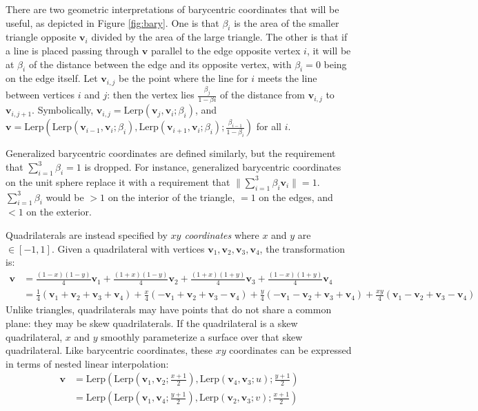 \documentclass{amsart}[12pt]
\begin{document}
There are two geometric interpretations of barycentric coordinates that will be
useful, as depicted in Figure \ref{fig:bary}. One is that $\beta_i$ is the area
of the smaller triangle opposite $\mathbf v_i$ divided by the area of the large
triangle.
The other is that if a line is placed passing through $\mathbf v$ parallel to
the edge opposite vertex $i$, it will be at $\beta_i$ of the distance between
the edge and its opposite vertex, with $\beta_i = 0$ being on the edge itself.
Let $\mathbf v_{i,j}$ be the point where the line for $i$ meets the line between
vertices $i$ and $j$: then the vertex lies $\frac{\beta_{j}}{1-\beta{i}}$
of the distance from $\mathbf v_{i,j}$ to $\mathbf v_{i,j+1}$. Symbolically,
$\mathbf v_{i,j} = \mathrm{Lerp}(\mathbf v_{j},\mathbf v_i;\beta_{i})$, and
$\mathbf v = \mathrm{Lerp}(\mathrm{Lerp}(\mathbf v_{i-1}, \mathbf v_i;
\beta_{i}), \mathrm{Lerp}(\mathbf v_{i+1}, \mathbf v_i; \beta_{i});
\frac{\beta_{i-1}}{1-\beta_{i}})$ for all $i$.

Generalized barycentric coordinates are defined similarly, but the requirement
that $\sum^3_{i=1} \beta_i = 1$ is dropped. For instance, generalized
barycentric coordinates on the unit sphere replace it with a requirement that
$\| \sum^3_{i=1} \beta_i \mathbf v_i \| = 1$. $\sum^3_{i=1} \beta_i$ would be
$>1$ on the interior of the triangle, $=1$ on the edges,
and $<1$ on the exterior.

Quadrilaterals are instead specified by \textit{$xy$ coordinates} where
$x$ and $y$ are $\in [-1, 1]$. Given a quadrilateral with vertices
$\mathbf v_1, \mathbf v_2, \mathbf v_3, \mathbf v_4$, the transformation is:
\begin{equation}\begin{split}
\mathbf v & = \frac{(1-x)(1-y)}{4} \mathbf v_1 +
\frac{(1+x)(1-y)}{4} \mathbf v_2 +
\frac{(1+x)(1+y)}{4} \mathbf v_3 +
\frac{(1-x)(1+y)}{4} \mathbf v_4 \\
&= \frac{1}{4} (\mathbf v_1 +\mathbf v_2 +\mathbf v_3 + \mathbf v_4)
+\frac{x}{4}  (-\mathbf v_1 +\mathbf v_2 +\mathbf v_3 - \mathbf v_4)
+\frac{y}{4}  (-\mathbf v_1 -\mathbf v_2 +\mathbf v_3 + \mathbf v_4)
+\frac{x y}{4} (\mathbf v_1 -\mathbf v_2 +\mathbf v_3 - \mathbf v_4)
\end{split}\end{equation}
Unlike triangles, quadrilaterals may have points that do not share a common
plane: they may be skew quadrilaterals. If the quadrilateral is a skew
quadrilateral, $x$ and $y$ smoothly parameterize a surface over that skew
quadrilateral. Like barycentric coordinates, these $xy$ coordinates can be
expressed in terms of nested linear interpolation:
\begin{equation}\begin{split}
\mathbf v
& = \mathrm{Lerp}(\mathrm{Lerp}(\mathbf v_1,\mathbf v_2;\frac{x+1}{2}),
\mathrm{Lerp}(\mathbf v_4,\mathbf v_3;u);\frac{y+1}{2}) \\
& = \mathrm{Lerp}(\mathrm{Lerp}(\mathbf v_1,\mathbf v_4;\frac{y+1}{2}),
\mathrm{Lerp}(\mathbf v_2,\mathbf v_3;v);\frac{x+1}{2})
\end{split}\end{equation}
\end{document}
